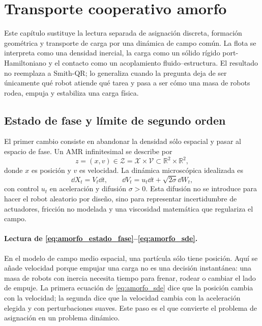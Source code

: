 \section{Transporte cooperativo amorfo}
\label{sec:transporte-amorfo}

Este capítulo sustituye la lectura separada de asignación discreta, formación geométrica
y transporte de carga por una dinámica de campo común. La flota se interpreta como una
densidad inercial, la carga como un sólido rígido port-Hamiltoniano y el contacto como un
acoplamiento fluido--estructura. El resultado no reemplaza a Smith-QR; lo generaliza
cuando la pregunta deja de ser únicamente qué robot atiende qué tarea y pasa a ser cómo
una masa de robots rodea, empuja y estabiliza una carga física.



\subsection{Estado de fase y límite de segundo orden}
\label{subsec:amorfo-fase}

El primer cambio consiste en abandonar la densidad sólo espacial y pasar al espacio de
fase. Un AMR infinitesimal se describe por
\begin{equation}
  z=(x,v)\in\mathcal Z=\mathcal X\times\mathcal V\subset\mathbb R^2\times\mathbb R^2,
  \label{eq:amorfo_estado_fase}
\end{equation}
donde $x$ es posición y $v$ es velocidad. La dinámica microscópica idealizada es
\begin{equation}
  \dd X_t=V_t\dd t,
  \qquad
  \dd V_t=u_t\dd t+\sqrt{2\sigma}\dd W_t ,
  \label{eq:amorfo_sde}
\end{equation}
con control $u_t$ en aceleración y difusión $\sigma>0$. Esta difusión no se introduce
para hacer el robot aleatorio por diseño, sino para representar incertidumbre de
actuadores, fricción no modelada y una viscosidad matemática que regulariza el campo.

\paragraph{Lectura de \eqref{eq:amorfo_estado_fase}--\eqref{eq:amorfo_sde}.}
En el modelo de campo medio espacial, una partícula sólo tiene posición. Aquí se añade
velocidad porque empujar una carga no es una decisión instantánea: una masa de robots con
inercia necesita tiempo para frenar, rodear o cambiar el lado de empuje. La primera
ecuación de \eqref{eq:amorfo_sde} dice que la posición cambia con la velocidad; la
segunda dice que la velocidad cambia con la aceleración elegida y con perturbaciones
suaves. Este paso es el que convierte el problema de asignación en un problema dinámico.


